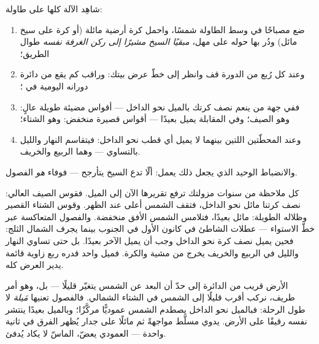 \begin{method}\label{met:g6:sun-earth-moon:globe}
شاهِد الآلة كلها على طاولة:
\begin{enumerate}
  \item ضع مصباحًا في وسط الطاولة شمسًا، واحمل كرة أرضية مائلة
        (أو كرة على سيخ مائل) ودُر بها حوله على مهل،
        \emph{مبقيًا السيخ مشيرًا إلى ركن الغرفة نفسه} طوال
        الطريق؛
  \item وعند كل رُبع من الدورة قف وانظر إلى خطّ عرض بيتك: وراقب
        كم يقع من دائرة دورانه اليومية في ؛
  \item ففي جهة من  ينعم نصف كرتك بالميل نحو الداخل ---
        أقواس مضيئة طويلة  عالٍ: وهو الصيف؛ وفي المقابلة
        يميل بعيدًا --- أقواس قصيرة  منخفض: وهو الشتاء؛
  \item وعند المحطّتين اللتين بينهما لا يميل أي قطب نحو الداخل:
        فيتقاسم النهار والليل بالتساوي --- وهما الربيع
        والخريف.
\end{enumerate}
والانضباط الوحيد الذي يجعل ذلك يعمل: ألّا تدع السيخ يتأرجح ---
فوفاء  \emph{هو} الفصول.
\end{method}

\begin{example}\label{ex:g6:sun-earth-moon:clues}
كل ملاحظة من سنوات مزولتك ترفع تقريرها الآن إلى الميل. فقوس
الصيف العالي: نصف كرتنا مائل نحو الداخل، فتقف الشمس أعلى عند
الظهر. وقوس الشتاء القصير وظلاله الطويلة: مائل بعيدًا، فتلامس
الشمس الأفق منخفضة. والفصول المتعاكسة عبر خطّ الاستواء ---
عطلات الشاطئ في كانون الأول في الجنوب بينما يجرف الشمال الثلج:
فحين يميل نصف كرة نحو الداخل وجب أن يميل الآخر بعيدًا. بل حتى
تساوي النهار والليل في الربيع والخريف يخرج من مشية 
والكرة. فميل واحد قدره ربع زاوية قائمة يدير العرض كله.
\end{example}

\begin{remark}\label{rem:g6:sun-earth-moon:notdistance}
 الأرض قريب من الدائرة إلى حدّ أن البعد عن الشمس يتغيّر
قليلًا --- بل، وهو أمر طريف، نركب أقرب قليلًا إلى الشمس في
الشتاء الشمالي. فالفصول تعنيها \emph{مَيلة}  لا طول الرحلة:
فبالميل نحو الداخل يصطدم  الشمس عموديًّا مركَّزًا؛ وبالميل
بعيدًا ينتشر  نفسه رقيقًا على الأرض.  يدوي مسلَّط
مواجهةً ثم مائلًا على جدار يُظهر الفرق في ثانية واحدة ---
 العمودي يعضّ،  الماسّ لا يكاد يُدفئ.
\end{remark}

